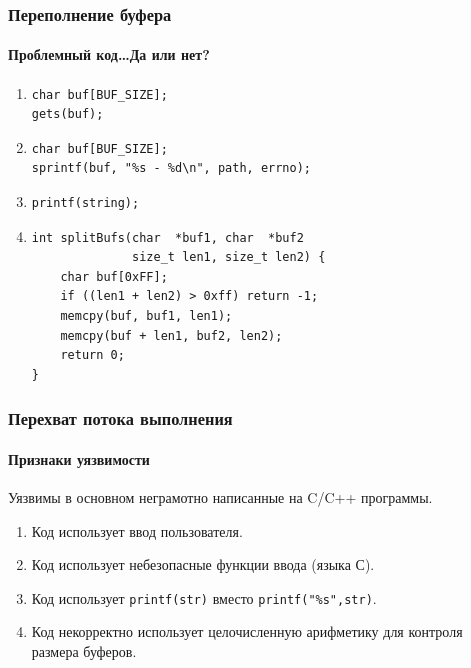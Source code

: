 \begin{frame}[fragile]
    \frametitle{Переполнение буфера}
    \framesubtitle{Проблемный код\ldots Да или нет?}
    
    \begin{enumerate}
        \item 
\begin{verbatim}
char buf[BUF_SIZE];
gets(buf);
\end{verbatim}
        \item
\begin{verbatim}
char buf[BUF_SIZE];
sprintf(buf, "%s - %d\n", path, errno);
\end{verbatim}
        \item
\begin{verbatim}
printf(string);
\end{verbatim}
        \item
\begin{verbatim}
int splitBufs(char  *buf1, char  *buf2
              size_t len1, size_t len2) {
    char buf[0xFF];
    if ((len1 + len2) > 0xff) return -1;
    memcpy(buf, buf1, len1);
    memcpy(buf + len1, buf2, len2);
    return 0;
}               
\end{verbatim}
    \end{enumerate}
\end{frame}

\begin{frame}[fragile]
    \frametitle{Перехват потока выполнения}
    \framesubtitle{Признаки уязвимости}
    
    Уязвимы в основном неграмотно написанные на C/C++ программы.
    
    \begin{enumerate}
        \item Код использует ввод пользователя.
        \item Код использует небезопасные функции ввода (языка С).
        \item Код использует \verb"printf(str)" вместо \verb'printf("%s",str)'.
        \item Код некорректно использует целочисленную арифметику для контроля размера буферов.
    \end{enumerate}
\end{frame}

